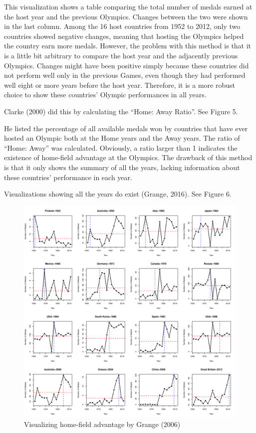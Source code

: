 \documentclass[12pt]{article}
\begin{document}
This visualization shows a table comparing the total number of medals earned at the host year and the previous Olympics. Changes between the two were shown in the last column.  Among the 16 host countries from 1952 to 2012, only two countries showed negative changes, meaning that hosting the Olympics helped the country earn more medals. However, the problem with this method is that it is a little bit arbitrary to compare the host year and the adjacently previous Olympics. Changes might have been positive simply because these countries did not perform well only in the previous Games, even though they had performed well eight or more years before the host year. Therefore, it is a more robust choice to show these countries’ Olympic performances in all years. 

Clarke (2000) did this by calculating the “Home: Away Ratio”. See Figure 5.

He listed the percentage of all available medals won by countries that have ever hosted an Olympic both at the Home years and the Away years. The ratio of “Home: Away” was calculated. Obviously, a ratio larger than 1 indicates the existence of home-field advantage at the Olympics. The drawback of this method is that it only shows the summary of all the years, lacking information about these countries’ performance in each year. 

Visualizations showing all the years do exist (Grange, 2016). See Figure 6.
\begin{figure}[!b]
    \centering
    \includegraphics[scale=0.215]{pics/2-2.png}
    \caption{Visualizing home-field advantage by Grange (2006)}
    \label{fig:my_label}
\end{figure}
\FloatBarrier %
\end{document}
